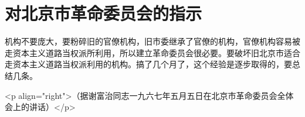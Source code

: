 \section[对北京市革命委员会的指示（一九六七年五月）]{对北京市革命委员会的指示}


机构不要庞大，要粉碎旧的官僚机构，旧市委继承了官僚的机构，官僚机构容易被走资本主义道路当权派所利用，所以建立革命委员会很必要。要破坏旧北京市适合走资本主义道路当权派利用的机构。搞了几个月了，这个经验是逐步取得的，要总结几条。

<p align="right">（据谢富治同志一九六七年五月五日在北京市革命委员会全体会上的讲话）</p>


